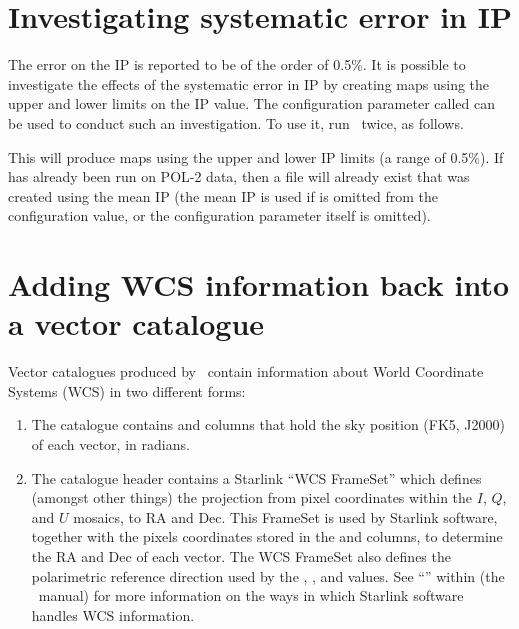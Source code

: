 \section{Investigating systematic error in IP}


The error on the IP is reported to be of the order of 0.5\%.  It is
possible to investigate the effects of the systematic error in IP by
creating maps using the upper and lower limits on the IP value. The
 configuration parameter called 
can be used to conduct such an investigation. To use it, run \poltwomap\ twice,
as follows.

\begin{terminalv}
\end{terminalv}

This will produce maps using the upper and lower IP limits (a range of
0.5\%). If  has already been run on POL-2 data, then a file will
already exist that was created using the mean IP (the mean IP is used
if  is omitted from the configuration value, or the
configuration parameter itself is omitted).



\section{\label{sec:wcscopy}Adding WCS information back into a vector catalogue}
Vector catalogues produced by \poltwomap\ contain information about World Coordinate
Systems (WCS) in two different forms:

\begin{enumerate}
\item The catalogue contains  and  columns that hold the sky position
(FK5, J2000) of each vector, in radians.
\item The catalogue header contains a Starlink ``WCS FrameSet'' which defines
(amongst other things) the projection from pixel coordinates within
the $I$, $Q$, and $U$ mosaics, to RA and Dec. This FrameSet is used by Starlink software, together
with the pixels coordinates stored in the  and  columns, to determine
the RA and Dec of each vector. The WCS FrameSet also defines the polarimetric
reference direction used by the , , and  values. See
``''
within  (the \KAPPA\ manual) for more information on
the ways in which Starlink software handles WCS information.
\end{enumerate}

